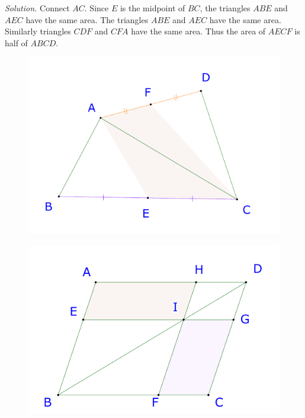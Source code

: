 \begin{multicols}{2}
	\textit{Solution.}
	Connect $AC.$ Since $E$ is the midpoint of $BC$, the triangles $ABE$ and $AEC$ have the same area. The triangles $ABE$ and $AEC$ have the same area.
	Similarly triangles $CDF$ and $CFA$ have the same area. Thus the area of $AECF$ is half of $ABCD.$
	\begin{figure}[H]
		\vspace*{-5pt}
		\centering
		\captionsetup{labelformat= empty, justification=centering}
		\includegraphics[width= 1\linewidth]{23-24-s3-i-p2-s.pdf}
		\vspace*{-10pt}
	\end{figure}
	\begin{figure}[H]
		\vspace*{-5pt}
		\centering
		\captionsetup{labelformat= empty, justification=centering}
		\includegraphics[width= 1\linewidth]{23-24-s3-i-p3.pdf}

\end{figure}
\end{multicols}
